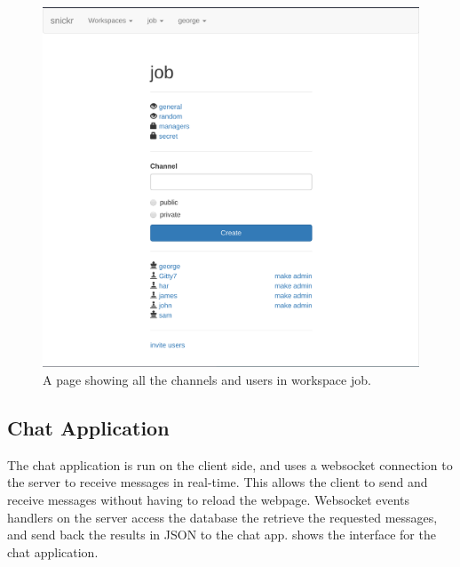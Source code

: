 \documentclass{article}
\begin{document}
\begin{figure}[!ht]
       \centering
       \includegraphics[width=0.9\linewidth]{channels}
       \caption{A page showing all the channels and users in workspace job.}
       \label{fig:channels}
\end{figure}

\subsection{Chat Application}

The chat application is run on the client side, and uses a websocket connection to the server to receive messages in real-time. This allows the client to send and receive messages without having to reload the webpage. Websocket events handlers on the server access the database the retrieve the requested messages, and send back the results in JSON to the chat app.  shows the interface for the chat application.
\end{document}
